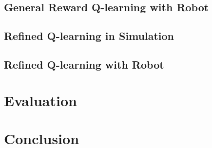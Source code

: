 \documentclass[12pt,a4paper]{article}
\begin{document}
\subsection{General Reward Q-learning with Robot}
\subsection{Refined Q-learning in Simulation}
\subsection{Refined Q-learning with Robot}
\section{Evaluation}
\section{Conclusion}



\end{document}
